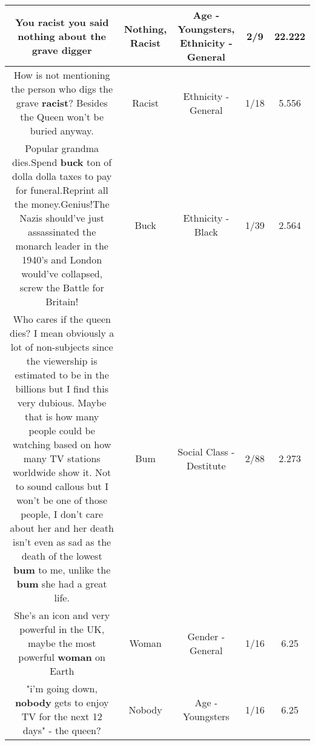 \documentclass[11pt]{article}
\newlength\mylength
\begin{document}
\begin{center}
\begin{longtable}{|C{.65\mylength}|C{.30\mylength}|C{.12\mylength}|C{.12\mylength}|C{.12\mylength}|}
  \small You \textbf{racist}  you said \textbf{nothing} about the grave digger\normalsize   & Nothing, Racist & Age - Youngsters, Ethnicity - General & 2/9 & 22.222 \\  \hline
  \small How is not mentioning the person who digs the grave \textbf{racist}? Besides the Queen won't be buried anyway.\normalsize   & Racist & Ethnicity - General & 1/18 & 5.556 \\  \hline
  \small Popular grandma dies.Spend \textbf{buck} ton of dolla dolla taxes to pay for funeral.Reprint all the money.Genius!The Nazis should've just assassinated the monarch leader in the 1940's and London would've collapsed, screw the Battle for Britain!\normalsize   & Buck & Ethnicity - Black & 1/39 & 2.564 \\  \hline
  \small Who cares if the queen dies? I mean obviously a lot of non-subjects since the viewership is estimated to be in the billions but I find this very dubious. Maybe that is how many people could be watching based on how many TV stations worldwide show it. Not to sound callous but I won't be one of those people, I don't care about her and her death isn't even as sad as the death of the lowest \textbf{bum} to me, unlike the \textbf{bum} she had a great life.\normalsize   & Bum & Social Class - Destitute & 2/88 & 2.273 \\  \hline
  \small She's an icon and very powerful in the UK, maybe the most powerful \textbf{woman} on Earth\normalsize   & Woman & Gender - General & 1/16 & 6.25 \\  \hline
  \small "i'm going down, \textbf{nobody} gets to enjoy TV for the next 12 days" - the queen?\normalsize   & Nobody & Age - Youngsters & 1/16 & 6.25 \\  \hline

\end{longtable}
\end{center}
\end{document}
